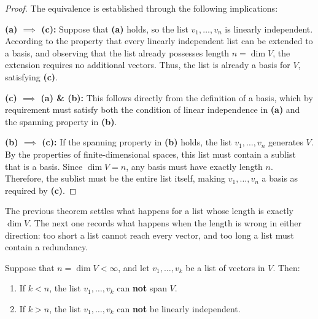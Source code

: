 \begin{proof}
The equivalence is established through the following implications:

\textbf{(a) $\implies$ (c):} Suppose that \textbf{(a)} holds, so the list $v_1, \dots, v_n$ is linearly independent. According to the property that every linearly independent list can be extended to a basis, and observing that the list already possesses length $n = \dim V$, the extension requires no additional vectors. Thus, the list is already a basis for $V$, satisfying \textbf{(c)}.

\textbf{(c) $\implies$ (a) \& (b):} This follows directly from the definition of a basis, which by requirement must satisfy both the condition of linear independence in \textbf{(a)} and the spanning property in \textbf{(b)}.

\textbf{(b) $\implies$ (c):} If the spanning property in \textbf{(b)} holds, the list $v_1, \dots, v_n$ generates $V$. By the properties of finite-dimensional spaces, this list must contain a sublist that is a basis. Since $\dim V = n$, any basis must have exactly length $n$. Therefore, the sublist must be the entire list itself, making $v_1, \dots, v_n$ a basis as required by \textbf{(c)}.
\end{proof}



The previous theorem settles what happens for a list whose length is exactly $\dim V$. The next one records what happens when the length is wrong in either direction: too short a list cannot reach every vector, and too long a list must contain a redundancy.

\begin{theorem}
\label{thm:wrong_length_lists}
Suppose that $n = \dim V < \infty$, and let $v_1, \dots, v_k$ be a list of vectors in $V$. Then:
\begin{enumerate}[label=\textbf{(\arabic*)}]
    \item If $k < n$, the list $v_1, \dots, v_k$ can \textbf{not} span $V$.
    \item If $k > n$, the list $v_1, \dots, v_k$ can \textbf{not} be linearly independent.
\end{enumerate}
\end{theorem}

